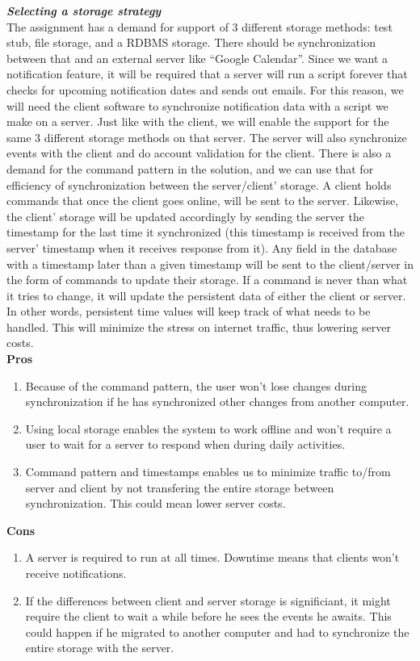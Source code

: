 \documentclass[a4paper]{article}
\begin{document}
\textit{\textbf{Selecting a storage strategy}}\\

The assignment has a demand for support of 3 different storage methods: test stub, file storage, and a RDBMS storage. There should be synchronization between that and an external server like “Google Calendar”. Since we want a notification feature, it will be required that a server will run a script forever that checks for upcoming notification dates and sends out emails. For this reason, we will need the client software to synchronize notification data with a script we make on a server. Just like with the client, we will enable the support for the same 3 different storage methods on that server. The server will also synchronize events with the client and do account validation for the client.  There is also a demand for the command pattern in the solution, and we can use that for efficiency of synchronization between the server/client’ storage. A client holds commands that once the client goes online, will be sent to the server. Likewise, the client’ storage will be updated accordingly by sending the server the timestamp for the last time it synchronized (this timestamp is received from the server’ timestamp when it receives response from it). Any field in the database with a timestamp later than a given timestamp will be sent to the client/server in the form of commands to update their storage. If a command is never than what it tries to change, it will update the persistent data of either the client or server. In other words, persistent time values will keep track of what needs to be handled. This will minimize the stress on internet traffic, thus lowering server costs.\\

\textbf{Pros}
\begin{enumerate}
\item Because of the command pattern, the user won't lose changes during synchronization if he has synchronized other changes from another computer.
\item Using local storage enables the system to work offline and won't require a user to wait for a server to respond when during daily activities.
\item Command pattern and timestamps enables us to minimize traffic to/from server and client by not transfering the entire storage between synchronization. This could mean lower server costs.
\end{enumerate}

\textbf{Cons}
\begin{enumerate}
\item A server is required to run at all times. Downtime means that clients won't receive notifications.
\item If the differences between client and server storage is significiant, it might require the client to wait a while before he sees the events he awaits. This could happen if he migrated to another computer and had to synchronize the entire storage with the server.
\end{enumerate}
\end{document}
